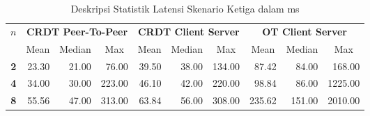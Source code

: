 \begin{table}[H]
 \centering
 \caption{Deskripsi Statistik Latensi Skenario Ketiga dalam ms}
\begin{tabular}{|c|rrr|rrr|rrr|}
\hline
\multirow{2}{*}{$n$} & \multicolumn{3}{c|}{\textbf{CRDT Peer-To-Peer}} & \multicolumn{3}{c|}{\textbf{CRDT Client Server}} & \multicolumn{3}{c|}{\textbf{OT Client Server}} \\ \cline{2-10}
 & \multicolumn{1}{c|}{Mean} & \multicolumn{1}{c|}{Median} & \multicolumn{1}{c|}{Max} & \multicolumn{1}{c|}{Mean} & \multicolumn{1}{c|}{Median} & \multicolumn{1}{c|}{Max} & \multicolumn{1}{c|}{Mean} & \multicolumn{1}{c|}{Median} & \multicolumn{1}{c|}{Max} \\ \hline
\textbf{2} & \multicolumn{1}{r|}{23.30} & \multicolumn{1}{r|}{21.00} & 76.00 & \multicolumn{1}{r|}{39.50} & \multicolumn{1}{r|}{38.00} & 134.00 & \multicolumn{1}{r|}{87.42} & \multicolumn{1}{r|}{84.00} & 168.00 \\ \hline
\textbf{4} & \multicolumn{1}{r|}{34.00} & \multicolumn{1}{r|}{30.00} & 223.00 & \multicolumn{1}{r|}{46.10} & \multicolumn{1}{r|}{42.00} & 220.00 & \multicolumn{1}{r|}{98.84} & \multicolumn{1}{r|}{86.00} & 1225.00 \\ \hline
\textbf{8} & \multicolumn{1}{r|}{55.56} & \multicolumn{1}{r|}{47.00} & 313.00 & \multicolumn{1}{r|}{63.84} & \multicolumn{1}{r|}{56.00} & 308.00 & \multicolumn{1}{r|}{235.62} & \multicolumn{1}{r|}{151.00} & 2010.00 \\ \hline
\end{tabular}
\end{table}

